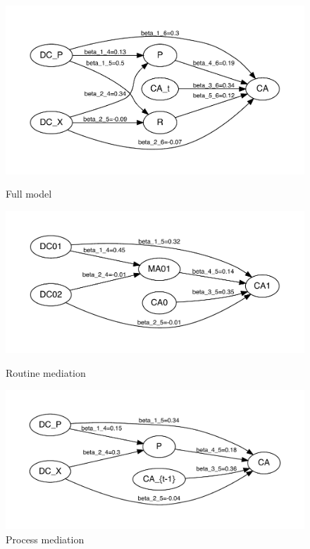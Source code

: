 \documentclass[review,fleqn]{elsarticle}\usepackage[]{graphicx}\usepackage[]{color}
\begin{document}
\begin{figure}[ht] \label{ fig7} 
  \begin{minipage}[b]{0.5\linewidth}
    \includegraphics[width=.99\linewidth]{full.pdf} 
    \caption{Full model} 
  \end{minipage} 
  \begin{minipage}[b]{0.5\linewidth}
    \includegraphics[width=.99\linewidth]{ma.pdf} 
    \caption{Routine mediation} 
  \end{minipage} 
  \begin{minipage}[b]{0.5\linewidth}
    \includegraphics[width=.99\linewidth]{or.pdf} 
    \caption{Process mediation} 

\end{minipage}
\end{figure}
\end{document}
